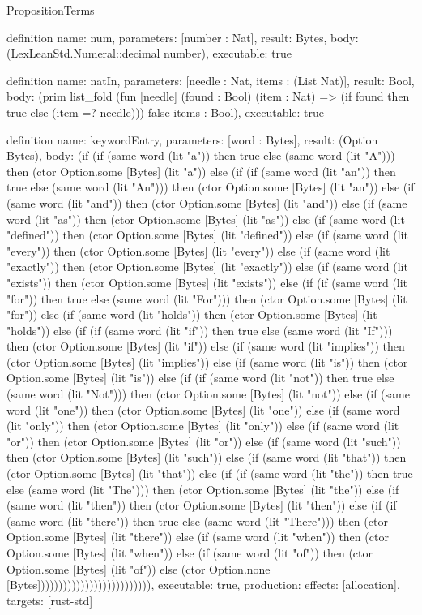 \begin{lexlean}{PropositionTerms}
\begin{semanticmodule}
definition{
  name: num,
  parameters: [number : Nat],
  result: Bytes,
  body: (LexLeanStd.Numeral::decimal number),
  executable: true
}

definition{
  name: natIn,
  parameters: [needle : Nat, items : (List Nat)],
  result: Bool,
  body: (prim list_fold (fun [needle] (found : Bool) (item : Nat) => (if found then true else (item =? needle))) false items : Bool),
  executable: true
}

definition{
  name: keywordEntry,
  parameters: [word : Bytes],
  result: (Option Bytes),
  body: (if (if (same word (lit "a")) then true else (same word (lit "A"))) then (ctor Option.some [Bytes] (lit "a")) else (if (if (same word (lit "an")) then true else (same word (lit "An"))) then (ctor Option.some [Bytes] (lit "an")) else (if (same word (lit "and")) then (ctor Option.some [Bytes] (lit "and")) else (if (same word (lit "as")) then (ctor Option.some [Bytes] (lit "as")) else (if (same word (lit "defined")) then (ctor Option.some [Bytes] (lit "defined")) else (if (same word (lit "every")) then (ctor Option.some [Bytes] (lit "every")) else (if (same word (lit "exactly")) then (ctor Option.some [Bytes] (lit "exactly")) else (if (same word (lit "exists")) then (ctor Option.some [Bytes] (lit "exists")) else (if (if (same word (lit "for")) then true else (same word (lit "For"))) then (ctor Option.some [Bytes] (lit "for")) else (if (same word (lit "holds")) then (ctor Option.some [Bytes] (lit "holds")) else (if (if (same word (lit "if")) then true else (same word (lit "If"))) then (ctor Option.some [Bytes] (lit "if")) else (if (same word (lit "implies")) then (ctor Option.some [Bytes] (lit "implies")) else (if (same word (lit "is")) then (ctor Option.some [Bytes] (lit "is")) else (if (if (same word (lit "not")) then true else (same word (lit "Not"))) then (ctor Option.some [Bytes] (lit "not")) else (if (same word (lit "one")) then (ctor Option.some [Bytes] (lit "one")) else (if (same word (lit "only")) then (ctor Option.some [Bytes] (lit "only")) else (if (same word (lit "or")) then (ctor Option.some [Bytes] (lit "or")) else (if (same word (lit "such")) then (ctor Option.some [Bytes] (lit "such")) else (if (same word (lit "that")) then (ctor Option.some [Bytes] (lit "that")) else (if (if (same word (lit "the")) then true else (same word (lit "The"))) then (ctor Option.some [Bytes] (lit "the")) else (if (same word (lit "then")) then (ctor Option.some [Bytes] (lit "then")) else (if (if (same word (lit "there")) then true else (same word (lit "There"))) then (ctor Option.some [Bytes] (lit "there")) else (if (same word (lit "when")) then (ctor Option.some [Bytes] (lit "when")) else (if (same word (lit "of")) then (ctor Option.some [Bytes] (lit "of")) else (ctor Option.none [Bytes]))))))))))))))))))))))))),
  executable: true,
  production: {effects: [allocation], targets: [rust-std]}
}


\end{semanticmodule}
\end{lexlean}
